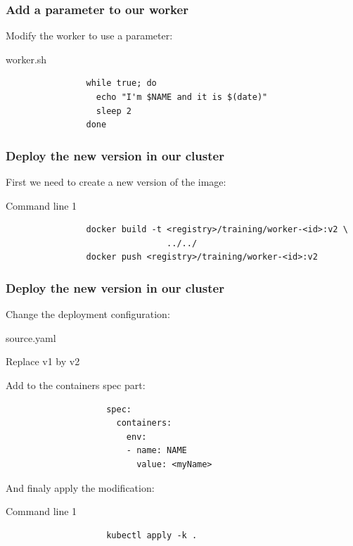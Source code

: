 	\begin{frame}[fragile]
		\frametitle{Add a parameter to our worker}
		
		Modify the worker to use a parameter:
		\begin{block}{worker.sh}
			\begin{verbatim}
				while true; do
				  echo "I'm $NAME and it is $(date)"
				  sleep 2
				done
			\end{verbatim}
		\end{block}
	\end{frame}
	
	\begin{frame}[fragile]
		\frametitle{Deploy the new version in our cluster}
		
		First we need to create a new version of the image:
		\begin{block}{Command line 1}
			\begin{verbatim}
				docker build -t <registry>/training/worker-<id>:v2 \
				                ../../
				docker push <registry>/training/worker-<id>:v2
			\end{verbatim}
		\end{block}
	\end{frame}
	
	\begin{frame}[fragile]
		\frametitle{Deploy the new version in our cluster}
		
		Change the deployment configuration:
		\begin{block}{source.yaml}
			\begin{small}
				Replace v1 by v2
			
				Add to the containers spec part:
				\begin{verbatim}
					spec:
					  containers:
					    env:
					    - name: NAME
					      value: <myName>
				\end{verbatim}
			\end{small}
		\end{block}
		
		And finaly apply the modification:
		\begin{block}{Command line 1}
			\begin{small}
					\begin{verbatim}
					kubectl apply -k .
				\end{verbatim}
			\end{small}
		\end{block}
	\end{frame}
	
